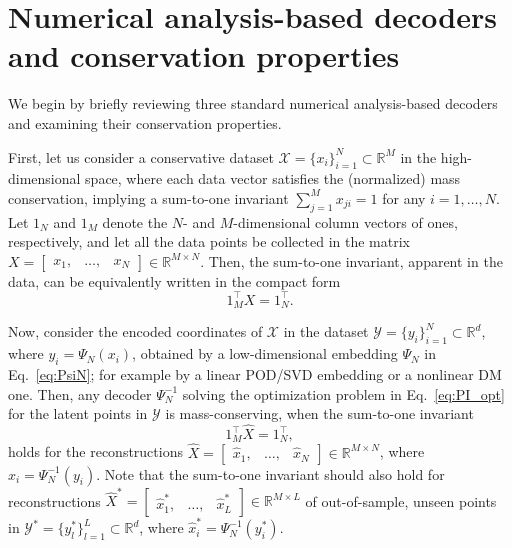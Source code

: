 \documentclass{article}
\begin{document}
\section{Numerical analysis-based decoders and conservation properties}
\label{sec:NA_PI_cons}
We begin by briefly reviewing three standard numerical analysis-based decoders and examining their conservation properties. 

First, let us consider a conservative dataset $\mathcal{X}=\{x_i\}_{i=1}^N\subset\mathbb{R}^M$ in the high-dimensional space, where each data vector satisfies the (normalized) mass conservation, implying a sum-to-one invariant $\sum_{j=1}^M x_{ji}=1$ for any $i=1,\ldots,N$. Let $1_N$ and $1_M$ denote the $N$- and $M$-dimensional column vectors of ones, respectively, and let all the data points be collected in the matrix 
$X = \begin{bmatrix} x_1, & \ldots, &x_N \end{bmatrix} \in \mathbb{R}^{M \times N}$. Then, the sum-to-one invariant, apparent in the data, can be equivalently written in the compact form 
\begin{equation}
    1_M^\top X = 1_N^\top.
    \label{eq:s2one_cons}
\end{equation}

Now, consider the encoded coordinates of $\mathcal{X}$ in the dataset $\mathcal{Y}=\{ y_i \}_{i=1}^N \subset \mathbb{R}^d$, where $y_i=\Psi_N(x_i)$, obtained by a low-dimensional embedding $\Psi_N$ in Eq.~\eqref{eq:PsiN}; for example by a linear POD/SVD embedding or a nonlinear DM one. Then, any decoder $\Psi_N^{-1}$ solving the optimization problem in Eq.~\eqref{eq:PI_opt} for the latent points in $\mathcal{Y}$ is mass-conserving, when the sum-to-one invariant
\begin{equation}
    1_M^\top \widehat{X} = 1_N^\top,
    \label{eq:s2one_cons_recon}
\end{equation}
holds for the reconstructions $\widehat{X}= \begin{bmatrix} \hat{x}_1, & \ldots, &\hat{x}_N \end{bmatrix} \in \mathbb{R}^{M \times N}$, where $\hat{x}_i=\Psi_N^{-1}(y_i)$. Note that the sum-to-one invariant should also hold for reconstructions $\widehat{X}^*=\begin{bmatrix} \hat{x}^*_1, & \ldots, &\hat{x}^*_L \end{bmatrix}\in \mathbb{R}^{M \times L}$ of out-of-sample, unseen points in $\mathcal{Y}^*=\{ y^*_l\}_{l=1}^L\subset \mathbb{R}^d$, where $\hat{x}^*_i=\Psi_N^{-1}(y^*_i)$.
\end{document}
